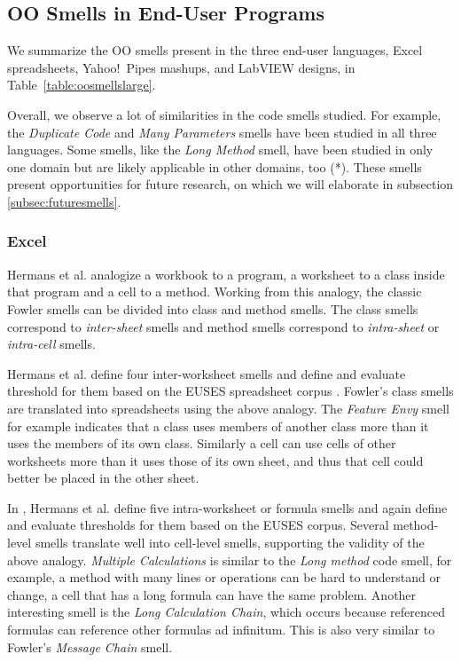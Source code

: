 \documentclass[10pt,conference,compsocconf]{IEEEtran}
\begin{document}
\subsection{OO Smells in End-User Programs}
\label{sec:smells:oo}
 We summarize the OO smells present in the three end-user languages, Excel spreadsheets, Yahoo!\ Pipes mashups, and LabVIEW designs, in Table~\ref{table:oosmellslarge}.
 
 Overall, we observe a lot of similarities in the code smells studied. For example, the \emph{Duplicate Code} and \emph{Many Parameters} smells have been studied in all three languages. Some smells, like the \emph{Long Method} smell, have been studied in only one domain but are likely applicable in other domains, too (*). These smells present opportunities for future research, on which we will elaborate in subsection \ref{subsec:futuresmells}.
 

 \subsubsection{Excel}
Hermans et al. \cite{Hermans2012inter} \cite{Hermans2012intra} analogize a workbook to a program, a worksheet to a class inside that program and a cell to a method.
Working from this analogy, the classic Fowler smells can be divided into class and method smells.
The class smells correspond to \textit{inter-sheet} smells and method smells correspond to \textit{intra-sheet} or \textit{intra-cell} smells.

Hermans et al. \cite{Hermans2012inter} define four inter-worksheet smells and define and evaluate threshold for them based on the EUSES spreadsheet corpus \cite{fisher2005euses}.
Fowler's class smells are translated into spreadsheets using the above analogy. 
The \textit{Feature Envy} smell for example indicates that a class uses members of another class more than it uses the members of its own class.
Similarly a cell can use cells of other worksheets more than it uses those of its own sheet, and thus that cell could better be placed in the other sheet.

In \cite{Hermans2012intra}, Hermans et al. define five intra-worksheet or formula smells and again define and evaluate thresholds for them based on the EUSES corpus.
Several method-level smells translate well into cell-level smells, supporting the validity of the above analogy.
\textit{Multiple Calculations} is similar to the \textit{Long method} code smell, for example, a method with many lines or operations can be hard to understand or change, a cell that has a long formula can have the same problem.
Another interesting smell is the \textit{Long Calculation Chain}, which occurs because referenced formulas can reference other formulas ad infinitum.
This is also very similar to Fowler's \textit{Message Chain} smell.
\end{document}
